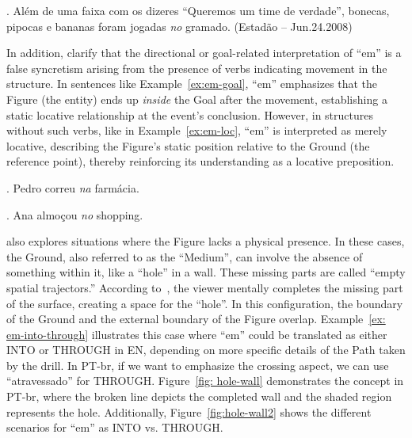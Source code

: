 {{\ex. Além de uma faixa com os dizeres “Queremos um time de verdade”, bonecas, pipocas e bananas foram jogadas \emph{no} gramado. (Estadão -- Jun.24.2008) \label{ex:em-at} 


In addition, \textcite{Ferreira-Basso-2020} clarify that the directional or goal-related interpretation of ``em'' is a false syncretism arising from the presence of verbs indicating movement in the structure. In sentences like Example~\ref{ex:em-goal}, ``em'' emphasizes that the Figure (the entity) ends up \emph{inside} the Goal after the movement, establishing a static locative relationship at the event's conclusion. However, in structures without such verbs, like in Example~\ref{ex:em-loc}, ``em'' is interpreted as merely locative, describing the Figure's static position relative to the Ground (the reference point), thereby reinforcing its understanding as a locative preposition.

\ex. Pedro correu \emph{na} farmácia.\label{ex:em-goal} 

\ex. Ana almoçou \emph{no} shopping.\label{ex:em-loc} 


\textcite{oliveira2012cognitive} also explores situations where the Figure lacks a physical presence. In these cases, the Ground, also referred to as the ``Medium'', can involve the absence of something within it, like a ``hole'' in a wall. These missing parts are called ``empty spatial trajectors.'' According to~\textcite{oliveira2012cognitive}, the viewer mentally completes the missing part of the surface, creating a space for the ``hole''. In this configuration, the boundary of the Ground and the external boundary of the Figure overlap. Example~\ref{ex: em-into-through} illustrates this case where ``em'' could be translated as either INTO or THROUGH in EN, depending on more specific details of the Path taken by the drill. In PT-br, if we want to emphasize the crossing aspect, we can use ``atravessado'' for THROUGH. Figure~\ref{fig: hole-wall} demonstrates the concept in PT-br, where the broken line depicts the completed wall and the shaded region represents the hole. Additionally, Figure~\ref{fig:hole-wall2} shows the different scenarios for ``em'' as INTO vs. THROUGH.

}}
